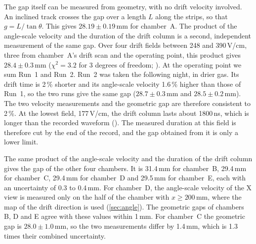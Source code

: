 The gap itself can be measured from geometry, with no drift velocity involved. An inclined track crosses the gap over
a length $L$ along the strips, so that $g=L/\tan\theta$. This gives $28.19\pm0.19$\,mm for chamber~A. The product of
the angle-scale velocity and the duration of the drift column is a second, independent measurement of the same gap.
Over four drift fields between 248 and 390\,V/cm, three from chamber~A's drift scan and the operating point, this
product gives $28.4\pm0.3$\,mm ($\chi^2=3.2$ for 3 degrees of freedom; ). At the operating point
we sum Run~1 and Run~2. Run~2 was taken the following night, in drier gas. Its drift time is 2\,\% shorter and its
angle-scale velocity 1.6\,\% higher than those of Run~1, so the two runs give the same gap ($28.7\pm0.3$\,mm and
$28.5\pm0.2$\,mm). The two velocity measurements and the geometric gap are therefore consistent
to 2\,\%. At the lowest field, 177\,V/cm, the drift column lasts about 1800\,ns, which is longer than the recorded
waveform (). The measured duration at this field is therefore cut by the end of the record, and the
gap obtained from it is only a lower limit.

The same product of the angle-scale velocity and the duration of the drift column gives the gap of the other four
chambers. It is 31.4\,mm for chamber~B, 29.4\,mm for chamber~C, 29.4\,mm for chamber~D and 29.5\,mm for chamber~E,
each with an uncertainty of 0.3 to 0.4\,mm. For chamber~D, the angle-scale velocity of the X view is measured only on the
half of the chamber with $x\ge200$\,mm, where the map of the drift direction is used (\cref{sec:angle}). The geometric
gaps of chambers B, D and E agree with these values within 1\,mm. For chamber~C the geometric gap is $28.0\pm1.0$\,mm,
so the two measurements differ by 1.4\,mm, which is 1.3 times their combined uncertainty.


